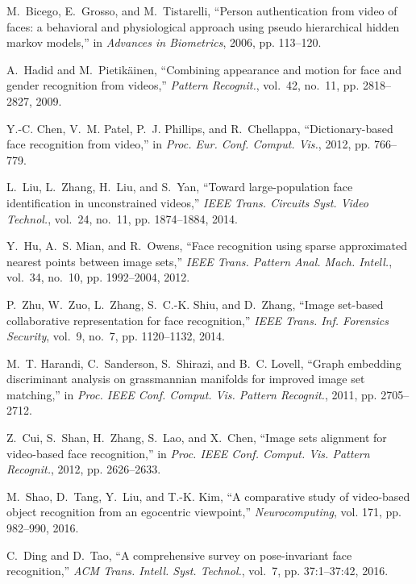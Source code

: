 \documentclass[10pt,journal,cspaper,compsoc]{IEEEtran}
\begin{document}
\begin{thebibliography}{10}
M.~Bicego, E.~Grosso, and M.~Tistarelli, ``Person authentication from video of
  faces: a behavioral and physiological approach using pseudo hierarchical
  hidden markov models,'' in \emph{Advances in Biometrics}, 2006, pp. 113--120.

A.~Hadid and M.~Pietik{\"a}inen, ``Combining appearance and motion for face and
  gender recognition from videos,'' \emph{Pattern Recognit.}, vol.~42, no.~11,
  pp. 2818--2827, 2009.

Y.-C. Chen, V.~M. Patel, P.~J. Phillips, and R.~Chellappa, ``Dictionary-based
  face recognition from video,'' in \emph{Proc. Eur. Conf. Comput. Vis.}, 2012,
  pp. 766--779.

L.~Liu, L.~Zhang, H.~Liu, and S.~Yan, ``Toward large-population face
  identification in unconstrained videos,'' \emph{IEEE Trans. Circuits Syst.
  Video Technol.}, vol.~24, no.~11, pp. 1874--1884, 2014.

Y.~Hu, A.~S. Mian, and R.~Owens, ``Face recognition using sparse approximated
  nearest points between image sets,'' \emph{IEEE Trans. Pattern Anal. Mach.
  Intell.}, vol.~34, no.~10, pp. 1992--2004, 2012.

P.~Zhu, W.~Zuo, L.~Zhang, S.~C.-K. Shiu, and D.~Zhang, ``Image set-based
  collaborative representation for face recognition,'' \emph{IEEE Trans. Inf.
  Forensics Security}, vol.~9, no.~7, pp. 1120--1132, 2014.

M.~T. Harandi, C.~Sanderson, S.~Shirazi, and B.~C. Lovell, ``Graph embedding
  discriminant analysis on grassmannian manifolds for improved image set
  matching,'' in \emph{Proc. IEEE Conf. Comput. Vis. Pattern Recognit.}, 2011,
  pp. 2705--2712.

Z.~Cui, S.~Shan, H.~Zhang, S.~Lao, and X.~Chen, ``Image sets alignment for
  video-based face recognition,'' in \emph{Proc. IEEE Conf. Comput. Vis.
  Pattern Recognit.}, 2012, pp. 2626--2633.

M.~Shao, D.~Tang, Y.~Liu, and T.-K. Kim, ``A comparative study of video-based
  object recognition from an egocentric viewpoint,'' \emph{Neurocomputing},
  vol. 171, pp. 982--990, 2016.

C.~Ding and D.~Tao, ``A comprehensive survey on pose-invariant face
  recognition,'' \emph{ACM Trans. Intell. Syst. Technol.}, vol.~7, pp.
  37:1--37:42, 2016.


\end{thebibliography}
\end{document}
